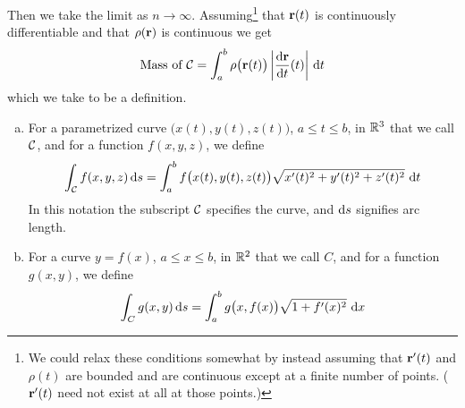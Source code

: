 Then we take the limit as $n\rightarrow\infty$. 
Assuming\footnote{We could
relax these conditions somewhat by instead assuming that $\mathbf{r}'(t)$ 
and $\rho(t)$ are bounded and are continuous except at a finite number
of points. ($\mathbf{r}'(t)$ need not exist at all at those points.)}
 that $\mathbf{r}(t)$ is continuously differentiable and that $\rho(\mathbf{r})$ 
is continuous we get
\begin{equation*}
\text{Mass of $\cC$} = \int_a^b \rho\big(\vr(t)\big) \left|\diff{\vr}{t}(t)\right|\,\dee{t}
\end{equation*}
which we take to be a definition.
\begin{defn}\label{def:lineIntegral}
\begin{enumerate}[(a)]
\item
For a parametrized curve $\big(x(t),y(t), z(t)\big)$, $a\le t\le b$,
in $\mathbb{R}^3$ that we call $\mathcal{C}$, and for a function $f(x,y,z)$, we define
\begin{equation*}
\int_\cC f(x,y,z)\,\dee{s} 
 =\int_a^b f\big(x(t), y(t) , z(t) \big)\sqrt{x'(t)^2+y'(t)^2+z'(t)^2}\ 
       \dee{t}
\end{equation*}
In this notation the subscript $\mathcal{C}$ specifies the curve, and $\mathrm{d}s$
signifies arc length.

\item  
For a curve $y=f(x)$, $a\le x\le b$, in $\mathbb{R}^2$ that we call $C$, 
and for a function $g(x,y)$, we define
\begin{equation*}
\int_C g(x,y)\,\dee{s} 
 =\int_a^b g\big(x, f(x) \big)\sqrt{1+f'(x)^2}\ 
       \dee{x}
\end{equation*}
\end{enumerate}
\end{defn}

